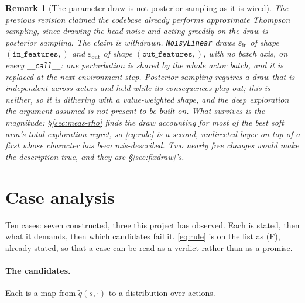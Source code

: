 \documentclass{article}
\newtheorem{remark}{Remark}
\begin{document}
\begin{remark}[The parameter draw is not posterior sampling as it is wired]
\label{rem:peraction}
The previous revision claimed the codebase already performs approximate Thompson sampling, since
drawing the head noise and acting greedily on the draw is posterior sampling. The claim is
withdrawn. \texttt{NoisyLinear} draws $\varepsilon_{\mathrm{in}}$ of shape
$(\texttt{in\_features},)$ and $\varepsilon_{\mathrm{out}}$ of shape
$(\texttt{out\_features},)$, with no batch axis, on every \texttt{\_\_call\_\_}: one perturbation
is shared by the whole actor batch, and it is replaced at the next environment step. Posterior
sampling requires a draw that is independent across actors and \emph{held} while its consequences
play out; this is neither, so it is dithering with a value-weighted shape, and the deep
exploration the argument assumed is not present to be built on. What survives is the magnitude:
\S\ref{sec:meas-rho} finds the draw accounting for most of the best soft arm's total exploration
regret, so \eqref{eq:rule} is a second, undirected layer on top of a first whose character has
been mis-described. Two nearly free changes would make the description true, and
they are \S\ref{sec:fixdraw}'s.
\end{remark}

\section{Case analysis}
\label{sec:cases}

Ten cases: seven constructed, three this project has observed. Each is stated, then what it
demands, then which candidates fail it. \eqref{eq:rule} is on the list as (F), already stated, so
that a case can be read as a verdict rather than as a promise.

\paragraph{The candidates.} Each is a map from $\tilde{q}(s,\cdot)$ to a distribution over
actions.
\end{document}
